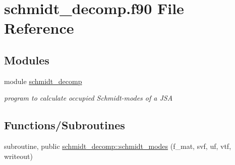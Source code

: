 \hypertarget{schmidt__decomp_8f90}{}\section{schmidt\+\_\+decomp.\+f90 File Reference}
\label{schmidt__decomp_8f90}
\subsection*{Modules}
\begin{DoxyCompactItemize}
\item 
module \hyperlink{namespaceschmidt__decomp}{schmidt\+\_\+decomp}
\begin{DoxyCompactList}\small\item\em program to calculate occupied Schmidt-\/modes of a J\+SA \end{DoxyCompactList}\end{DoxyCompactItemize}
\subsection*{Functions/\+Subroutines}
\begin{DoxyCompactItemize}
\item 
subroutine, public \hyperlink{namespaceschmidt__decomp_a1ecb1a8137ed80c2bb76c38ba9ebe773}{schmidt\+\_\+decomp\+::schmidt\+\_\+modes} (f\+\_\+mat, svf, uf, vtf, writeout)
\end{DoxyCompactItemize}
